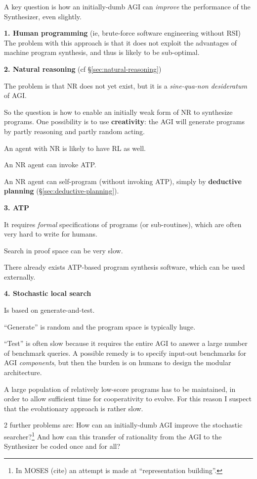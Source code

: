 A key question is how an initially-dumb AGI can \textit{improve} the performance of the Synthesizer, even slightly.

\textbf{1. Human programming} (ie, brute-force software engineering without RSI)\\
The problem with this approach is that it does not exploit the advantages of machine program synthesis, and thus is likely to be sub-optimal.

\textbf{2. Natural reasoning} (cf \S\ref{sec:natural-reasoning})
\begin{compactenum}[(a)]
\item  The problem is that NR does not yet exist, but it is a \textit{sine-qua-non desideratum} of AGI.
\item  So the question is how to enable an initially weak form of NR to synthesize programs.  One possibility is to use \textbf{creativity}:  the AGI will generate programs by partly reasoning and partly random acting.
\item  An agent with NR is likely to have RL as well.
\item  An NR agent can invoke ATP.
\item  An NR agent can self-program (without invoking ATP), simply by \textbf{deductive planning} (\S\ref{sec:deductive-planning}).\\
\end{compactenum}

\textbf{3. ATP}
\begin{compactenum}[(a)]
\item  It requires \textit{formal} specifications of programs (or sub-routines), which are often very hard to write for humans.
\item  Search in proof space can be very slow.
\item  There already exists ATP-based program synthesis software, which can be used externally.\\
\end{compactenum}

\textbf{4. Stochastic local search}
\begin{compactenum}[(a)]
\item  Is based on generate-and-test.
\item  ``Generate'' is random and the program space is typically huge.
\item  ``Test'' is often slow because it requires the entire AGI to answer a large number of benchmark queries.  A possible remedy is to specify input-out benchmarks for AGI \textit{components}, but then the burden is on humans to design the modular architecture.
\item  A large population of relatively low-score programs has to be maintained, in order to allow sufficient time for cooperativity to evolve.  For this reason I suspect that the evolutionary approach is rather slow.
\item  2 further problems are:  How can an initially-dumb AGI improve the stochastic searcher?\footnote{In MOSES (cite) an attempt is made at ``representation building''.} And how can this transfer of rationality from the AGI to the Synthesizer be coded once and for all?\\
\end{compactenum}


